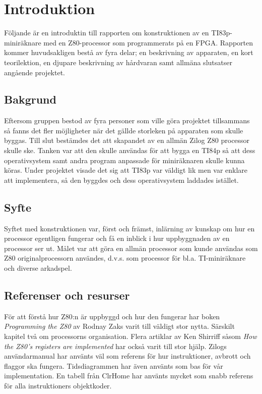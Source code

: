 \documentclass[main.tex]{subfiles}
\begin{document}
\section{Introduktion}
Följande är en introduktin till rapporten om konstruktionen av en
TI83p-miniräknare med en Z80-processor som programmerats på en FPGA.
Rapporten kommer huvudsakligen bestå av fyra delar; en beskrivning av
apparaten, en kort teorilektion, en djupare beskrivning av hårdvaran samt
allmäna slutsatser angående projektet.

\subsection{Bakgrund}
Eftersom gruppen bestod av fyra personer som ville göra projektet tillsammans
så fanns det fler möjligheter när det gällde storleken på apparaten som skulle
byggas. Till slut bestämdes det att skapandet av en allmän Zilog Z80 processor
skulle ske. Tanken var att den skulle användas för att bygga en TI84p så att
dess operativsystem samt andra program anpassade för miniräknaren skulle kunna
köras. Under projektet visade det sig att TI83p var väldigt lik men var enklare
att implementera, så den byggdes och dess operativsystem laddades istället.

\subsection{Syfte}
Syftet med konstruktionen var, först och främst, inlärning av kunskap om hur en
processor egentligen fungerar och få en inblick i hur uppbyggnaden av en
processor ser ut. Målet var att göra en allmän processor som kunde användas som
Z80 originalprocessorn användes, d.v.s. som processor för bl.a. TI-miniräknare
och diverse arkadspel.

\subsection{Referenser och resurser} För att förstå hur Z80:n är uppbyggd och
hur den fungerar har boken {\it Programming the Z80}\cite{zaks-z80prog} av
Rodnay Zaks varit till väldigt stor nytta. Särskilt kapitel två om processorns
organisation. Flera artiklar av Ken Shirriff såsom {\it How the Z80's registers
are implemented}\cite{shirriff-reg} har också varit till stor hjälp. Zilogs
användarmanual\cite{z80um} har använts väl som referens för hur instruktioner,
avbrott och flaggor ska fungera.  Tidsdiagrammen har även använts som bas för
vår implementation. En tabell från ClrHome\cite{clrhome} har använts mycket som
snabb referens för alla instruktioners objektkoder.
\end{document}
